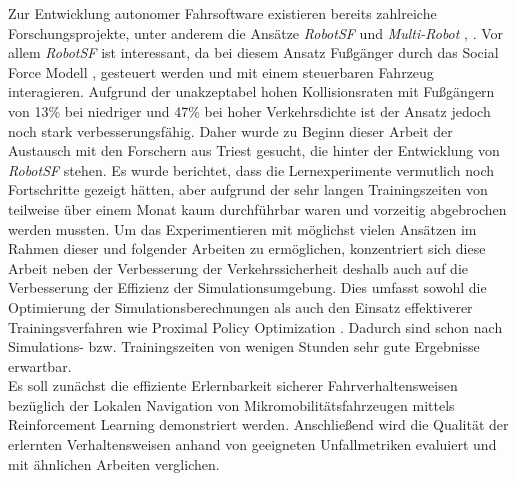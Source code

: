 Zur Entwicklung autonomer Fahrsoftware existieren bereits zahlreiche Forschungsprojekte,
unter anderem die Ansätze \emph{RobotSF} \cite{machines11020268} und \emph{Multi-Robot}
\cite{fan2020distributed}, \cite{Shunyi2020multirobot2}. Vor allem \emph{RobotSF} ist
interessant, da bei diesem Ansatz Fußgänger durch das Social Force Modell
\cite{helbig1995socialforce}, \cite{moussaid2010groupssf} gesteuert werden und mit einem
steuerbaren Fahrzeug interagieren. Aufgrund der unakzeptabel hohen Kollisionsraten mit
Fußgängern von 13\% bei niedriger und 47\% bei hoher Verkehrsdichte ist der Ansatz jedoch noch
stark verbesserungsfähig. Daher wurde zu Beginn dieser Arbeit der Austausch mit den Forschern
aus Triest gesucht, die hinter der Entwicklung von \emph{RobotSF} stehen. Es wurde berichtet,
dass die Lernexperimente vermutlich noch Fortschritte gezeigt hätten, aber aufgrund der sehr
langen Trainingszeiten von teilweise über einem Monat kaum durchführbar waren und vorzeitig
abgebrochen werden mussten. Um das Experimentieren mit möglichst vielen Ansätzen im Rahmen
dieser und folgender Arbeiten zu ermöglichen, konzentriert sich diese Arbeit neben der
Verbesserung der Verkehrssicherheit deshalb auch auf die Verbesserung der Effizienz der
Simulationsumgebung. Dies umfasst sowohl die Optimierung der Simulationsberechnungen als
auch den Einsatz effektiverer Trainingsverfahren wie Proximal Policy Optimization
\cite{schulman2018ppo}. Dadurch sind schon nach Simulations- bzw. Trainingszeiten
von wenigen Stunden sehr gute Ergebnisse erwartbar.\\

Es soll zunächst die effiziente Erlernbarkeit sicherer Fahrverhaltensweisen bezüglich
der Lokalen Navigation von Mikromobilitätsfahrzeugen mittels Reinforcement Learning
demonstriert werden. Anschließend wird die Qualität der erlernten Verhaltensweisen anhand
von geeigneten Unfallmetriken evaluiert und mit ähnlichen Arbeiten verglichen.
